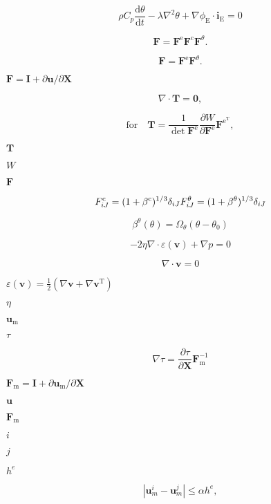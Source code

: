 \documentclass{article}
\begin{document}
\[ \rho C_p\frac{\text{d}\theta}{\text{d}t}-\lambda \nabla^2\theta+\nabla\phi_\text{E}\cdot\boldsymbol{i}_\text{E}=0 \]
\pagebreak

\[ \boldsymbol{F}=\boldsymbol{F}^\text{e}\boldsymbol{F}^\text{c}\boldsymbol{F}^{\theta}. \]
\pagebreak

\[ \boldsymbol{F}=\boldsymbol{F}^\text{e}\boldsymbol{F}^{\theta}. \]
\pagebreak

$\boldsymbol{F} = \boldsymbol{I} + \partial\boldsymbol{u}/\partial\boldsymbol{X}$
\pagebreak

\[ \nabla\cdot\boldsymbol{T} = \boldsymbol{0}, \]
\pagebreak

\[ \text{for}\quad \boldsymbol{T}= \frac{1}{\det{\boldsymbol{F}^\text{e}}}\frac{\partial W}{\partial \boldsymbol{F}^\text{e}}\boldsymbol{F}^{\text{e}^\text{T}}, \]
\pagebreak

$\boldsymbol{T}$
\pagebreak

$W$
\pagebreak

$\boldsymbol{F}$
\pagebreak

\[ F^{\text{c}}_{iJ}=(1+\beta^{\text{c}})^{1/3}\delta_{iJ} \\ F^{\theta}_{iJ}=(1+\beta^{\theta})^{1/3}\delta_{iJ} \]
\pagebreak

\[ \beta^{\theta}(\theta)=\Omega_{\theta} (\theta-\theta_0) \]
\pagebreak

\[ -2\eta\nabla\cdot\varepsilon(\boldsymbol{v})+\nabla p=0 \]
\pagebreak

\[ \nabla\cdot\boldsymbol{v}=0 \]
\pagebreak

$\varepsilon(\boldsymbol{v})=\frac{1}{2}(\nabla\boldsymbol{v}+\nabla\boldsymbol{v}^\text{T})$
\pagebreak

$\eta$
\pagebreak

$\boldsymbol{u}_\text{m}$
\pagebreak

$\tau$
\pagebreak

\[ \nabla \tau=\frac{\partial\tau}{\partial\boldsymbol{X}}\boldsymbol{F}_\text{m}^{-1} \]
\pagebreak

$\boldsymbol{F}_\text{m}= \boldsymbol{I} +\partial \boldsymbol{u}_\text{m}/\partial \boldsymbol{X}$
\pagebreak

$\boldsymbol{u}$
\pagebreak

$\boldsymbol{F}_\text{m}$
\pagebreak

$i$
\pagebreak

$j$
\pagebreak

$h^e$
\pagebreak

\[ |\boldsymbol{u}_m^i-\boldsymbol{u}_m^j|\le\alpha h^e, \]
\pagebreak
\end{document}
